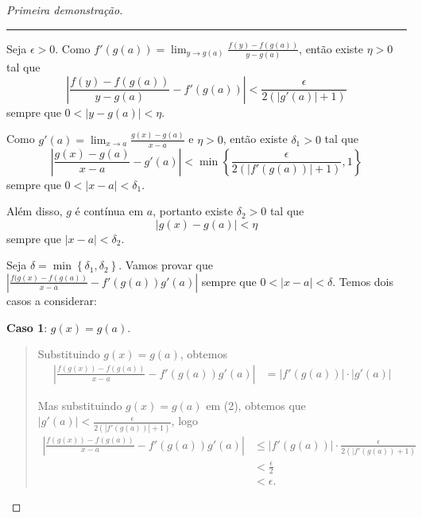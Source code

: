 \begin{proof}[Primeira demonstração]
	\hrule
	
	Seja $\epsilon>0$. Como $f'(g(a))=\lim_{y\to g(a)}\frac{f(y)-f(g(a))}{y-g(a)}$, então existe $\eta>0$ tal que
	\[\left|\frac{f(y)-f(g(a))}{y-g(a)}-f'(g(a))\right|<\frac{\epsilon}{2(|g'(a)|+1)}\tag{1}\]
	sempre que $0<|y-g(a)|<\eta$.
	
	Como $g'(a)=\lim_{x\to a}\frac{g(x)-g(a)}{x-a}$ e $\eta>0$, então existe $\delta_1>0$ tal que
	\[\left|\frac{g(x)-g(a)}{x-a}-g'(a)\right|<\min\left\{\frac{\epsilon}{2(|f'(g(a))|+1)},1\right\}\tag{2}\]		
	sempre que $0<|x-a|<\delta_1$.
	
	Além disso, $g$ é contínua em $a$, portanto existe $\delta_2>0$ tal que
	\[\left|g(x)-g(a)\right|<\eta\tag{3}\]
	sempre que $|x-a|<\delta_2$.
	
	Seja $\delta=\min\left\{\delta_1,\delta_2\right\}$. Vamos provar que $\left|\frac{f(g(x)-f(g(a))}{x-a}-f'(g(a))g'(a)\right|$ sempre que $0<|x-a|<\delta$. Temos dois casos a considerar:
	
	\textbf{Caso 1}: $g(x)=g(a)$.
	\begin{quote}
		Substituindo $g(x)=g(a)$, obtemos
		\begin{align*}
			\left|\frac{f(g(x))-f(g(a))}{x-a}-f'(g(a))g'(a)\right|
				&=|f'(g(a))|\cdot|g'(a)|
		\end{align*}
		
		Mas substituindo $g(x)=g(a)$ em (2), obtemos que $|g'(a)|<\frac{\epsilon}{2(|f'(g(a))|+1)}$, logo
		\begin{align*}
			\left|\frac{f(g(x))-f(g(a))}{x-a}-f'(g(a))g'(a)\right|
				&\leq |f'(g(a))|\cdot\frac{\epsilon}{2(|f'(g(a))+1)}\\
				&<\frac{\epsilon}{2}\\
				&<\epsilon.
		\end{align*}
	\end{quote}
	

\end{proof}
